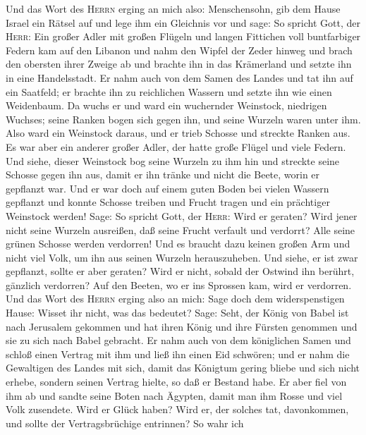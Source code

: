  Und das Wort des \textsc{Herrn} erging an mich also:
 Menschensohn, gib dem Hause Israel ein Rätsel auf und
lege ihm ein Gleichnis vor und sage:  So spricht Gott, der
\textsc{Herr}: Ein großer Adler mit großen Flügeln und langen Fittichen
voll buntfarbiger Federn kam auf den Libanon und nahm den Wipfel der
Zeder hinweg  und brach den obersten ihrer Zweige ab und
brachte ihn in das Krämerland und setzte ihn in eine Handelsstadt.
 Er nahm auch von dem Samen des Landes und tat ihn auf ein
Saatfeld; er brachte ihn zu reichlichen Wassern und setzte ihn wie einen
Weidenbaum.  Da wuchs er und ward ein wuchernder
Weinstock, niedrigen Wuchses; seine Ranken bogen sich gegen ihn, und
seine Wurzeln waren unter ihm. Also ward ein Weinstock daraus, und er
trieb Schosse und streckte Ranken aus.  Es war aber ein
anderer großer Adler, der hatte große Flügel und viele Federn. Und
siehe, dieser Weinstock bog seine Wurzeln zu ihm hin und streckte seine
Schosse gegen ihn aus, damit er ihn tränke und nicht die Beete, worin er
gepflanzt war.  Und er war doch auf einem guten Boden bei
vielen Wassern gepflanzt und konnte Schosse treiben und Frucht tragen
und ein prächtiger Weinstock werden!  Sage: So spricht
Gott, der \textsc{Herr}: Wird er geraten? Wird jener nicht seine Wurzeln
ausreißen, daß seine Frucht verfault und verdorrt? Alle seine grünen
Schosse werden verdorren! Und es braucht dazu keinen großen Arm und
nicht viel Volk, um ihn aus seinen Wurzeln herauszuheben.
 Und siehe, er ist zwar gepflanzt, sollte er aber
geraten? Wird er nicht, sobald der Ostwind ihn berührt, gänzlich
verdorren? Auf den Beeten, wo er ins Sprossen kam, wird er verdorren.
 Und das Wort des \textsc{Herrn} erging also an mich:
 Sage doch dem widerspenstigen Hause: Wisset ihr nicht,
was das bedeutet? Sage: Seht, der König von Babel ist nach Jerusalem
gekommen und hat ihren König und ihre Fürsten genommen und sie zu sich
nach Babel gebracht.  Er nahm auch von dem königlichen
Samen und schloß einen Vertrag mit ihm und ließ ihn einen Eid schwören;
und er nahm die Gewaltigen des Landes mit sich,  damit
das Königtum gering bliebe und sich nicht erhebe, sondern seinen Vertrag
hielte, so daß er Bestand habe.  Er aber fiel von ihm ab
und sandte seine Boten nach Ägypten, damit man ihm Rosse und viel Volk
zusendete. Wird er Glück haben? Wird er, der solches tat, davonkommen,
und sollte der Vertragsbrüchige entrinnen?  So wahr ich
